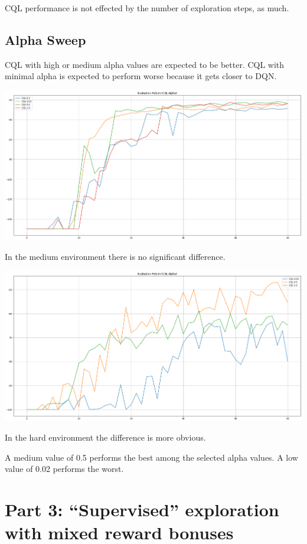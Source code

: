 \documentclass[11pt]{article}
\begin{document}
    CQL performance is not effected by the number of exploration steps, as much.

    \subsection{Alpha Sweep}

    CQL with high or medium alpha values are expected to be better.
    CQL with minimal alpha is expected to perform worse because it gets closer to DQN.

    \hspace*{-0.6in}
    \includegraphics[scale=0.30]{p2-p3/medium}

    In the medium environment there is no significant difference.

    \hspace*{-0.6in}
    \includegraphics[scale=0.30]{p2-p3/hard}

    In the hard environment the difference is more obvious.

    A medium value of 0.5 performs the best among the selected alpha values.
    A low value of 0.02 performs the worst.


    \section{Part 3: “Supervised” exploration with mixed reward bonuses}
\end{document}
